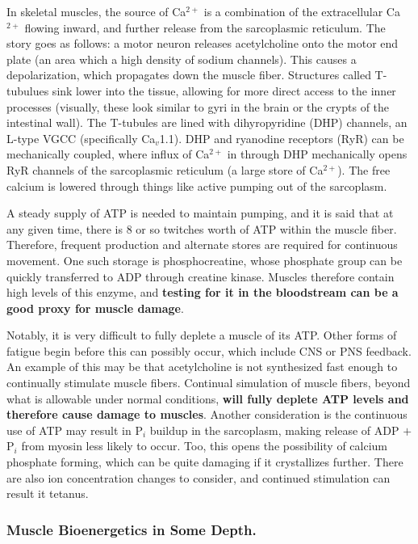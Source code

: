 In skeletal muscles, the source of Ca$^{2+}$ is a combination of the extracellular Ca$^{2+}$ flowing inward, and further release from the sarcoplasmic reticulum. The story goes as follows: a motor neuron releases acetylcholine onto the motor end plate (an area which a high density of sodium channels). This causes a depolarization, which propagates down the muscle fiber. Structures called T-tubulues sink lower into the tissue, allowing for more direct access to the inner processes (visually, these look similar to gyri in the brain or the crypts of the intestinal wall). The T-tubules are lined with dihyropyridine (DHP) channels, an L-type VGCC (specifically Ca$_v$1.1). DHP and ryanodine receptors (RyR) can be mechanically coupled, where influx of Ca$^{2+}$ in through DHP mechanically opens RyR channels of the sarcoplasmic reticulum (a large store of Ca$^{2+}$). The free calcium is lowered through things like active pumping out of the sarcoplasm.\newline

A steady supply of ATP is needed to maintain pumping, and it is said that at any given time, there is 8 or so twitches worth of ATP within the muscle fiber. Therefore, frequent production and alternate stores are required for continuous movement. One such storage is phosphocreatine, whose phosphate group can be quickly transferred to ADP through creatine kinase. Muscles therefore contain high levels of this enzyme, and \textbf{testing for it in the bloodstream can be a good proxy for muscle damage}.\newline

Notably, it is very difficult to fully deplete a muscle of its ATP. Other forms of fatigue begin before this can possibly occur, which include CNS or PNS feedback. An example of this may be that acetylcholine is not synthesized fast enough to continually stimulate muscle fibers. Continual simulation of muscle fibers, beyond what is allowable under normal conditions, \textbf{will fully deplete ATP levels and therefore cause damage to muscles}. Another consideration is the continuous use of ATP may result in P$_i$ buildup in the sarcoplasm, making release of ADP $+$ P$_i$ from myosin less likely to occur. Too, this opens the possibility of calcium phosphate forming, which can be quite damaging if it crystallizes further. There are also ion concentration changes to consider, and continued stimulation can result it tetanus.

\subsubsection{Muscle Bioenergetics in Some Depth.}

